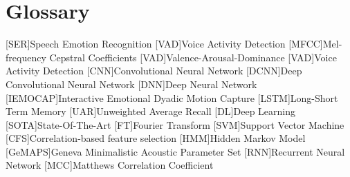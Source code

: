 \chapter{Glossary}

\footnotesize
\SingleSpacing

\begin{multicols}{2}
\begin{acronym}[AAAAAA]

    [SER]{Speech Emotion Recognition}
    [VAD]{Voice Activity Detection}
    [MFCC]{Mel-frequency Cepstral Coefficients}
    [VAD]{Valence-Arousal-Dominance}
    [VAD]{Voice Activity Detection}
    [CNN]{Convolutional Neural Network}
    [DCNN]{Deep Convolutional Neural Network}
    [DNN]{Deep Neural Network}
    [IEMOCAP]{Interactive Emotional Dyadic Motion Capture}
    [LSTM]{Long-Short Term Memory}
    [UAR]{Unweighted Average Recall}
    [DL]{Deep Learning}
    [SOTA]{State-Of-The-Art}
    [FT]{Fourier Transform}
    [SVM]{Support Vector Machine}
    [CFS]{Correlation-based feature selection}
    [HMM]{Hidden Markov Model}
    [GeMAPS]{Geneva Minimalistic Acoustic Parameter Set}
    [RNN]{Recurrent Neural Network}
    [MCC]{Matthews Correlation Coefficient}
\end{acronym}
\end{multicols}

